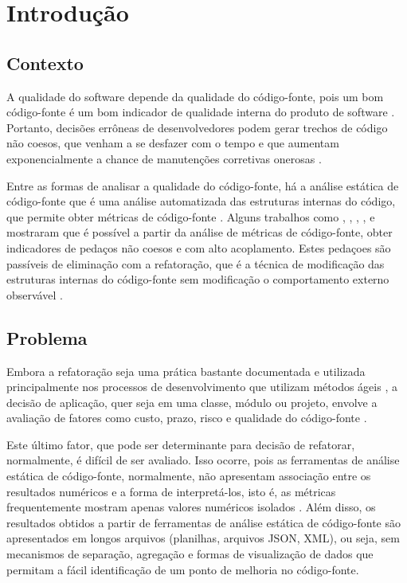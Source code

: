 \chapter{Introdução}


\section {Contexto}
A qualidade do software depende da qualidade do código-fonte, pois um bom código-fonte é um bom indicador de qualidade interna do produto de software \cite{beck2003test} \cite{ISO25023}. Portanto, decisões errôneas de desenvolvedores podem gerar trechos de código não coesos, que venham a se desfazer com o tempo e que aumentam exponencialmente a chance de manutenções corretivas onerosas \cite{beck2007implementation} \cite{beck1999}.


Entre as formas de analisar a qualidade do código-fonte, há a análise estática de código-fonte que é uma análise automatizada das estruturas internas do código, que permite obter métricas de código-fonte \cite{Emanuelsson2008} \cite{Wichmann95}  \cite{Nielson:1999} \cite{Sommerville10}. Alguns trabalhos como , , , ,  e  mostraram que é possível a partir da análise de métricas de código-fonte, obter indicadores de pedaços não coesos e com alto acoplamento. Estes pedaçoes são passíveis de eliminação com a refatoração, que é a técnica de modificação das estruturas internas do código-fonte sem modificação o comportamento externo observável \cite{fowler1999refactoring}.


\section{Problema}


Embora a refatoração seja uma prática bastante documentada e utilizada principalmente nos processos de desenvolvimento que utilizam métodos ágeis \cite{beck1999}, a decisão de aplicação, quer seja em uma classe, módulo ou projeto, envolve a avaliação de fatores como custo, prazo, risco e qualidade do código-fonte \cite{yamashita2013assessing}.  

Este último fator, que pode ser determinante para decisão de refatorar, normalmente, é difícil de ser avaliado. Isso ocorre, pois as ferramentas de análise estática de código-fonte, normalmente, não apresentam associação entre os resultados numéricos e a forma de interpretá-los, isto é, as métricas frequentemente mostram apenas valores numéricos isolados \cite{Meirelles2013}. Além disso, os resultados obtidos a partir de ferramentas de análise estática de código-fonte são apresentados em longos arquivos (planilhas, arquivos JSON, XML), ou seja, sem mecanismos de separação, agregação e formas de visualização de dados que permitam a fácil identificação de um ponto de melhoria no código-fonte.


